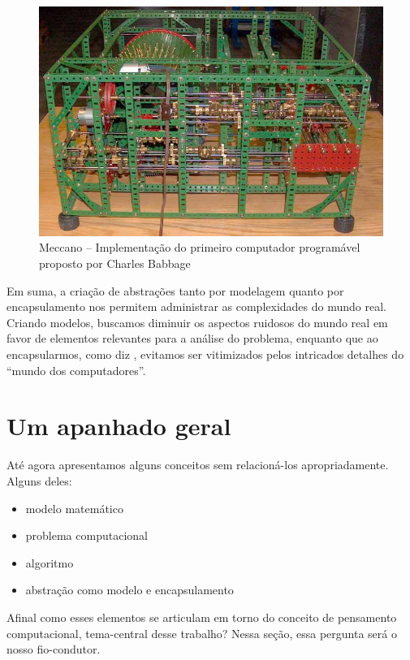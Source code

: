 \begin{figure}[!htb]
	\caption{Meccano -- Implementação do primeiro computador programável proposto por Charles Babbage }\label{fig:meccano}
	\begin{center}
		\includegraphics[scale=0.45]{imagens/babbage}
	\end{center}
\end{figure}

Em suma, a criação de abstrações tanto por modelagem quanto por encapsulamento nos permitem administrar as complexidades do mundo real. Criando modelos, buscamos diminuir os aspectos ruidosos do mundo real em favor de elementos relevantes para a análise do problema, enquanto que ao encapsularmos, como diz , evitamos ser vitimizados pelos intricados detalhes do ``mundo dos computadores''.

\section{Um apanhado geral}

Até agora apresentamos alguns conceitos sem relacioná-los apropriadamente. Alguns deles:

\begin{itemize}
	\item modelo matemático
	\item problema computacional
	\item algoritmo
	\item abstração como modelo e encapsulamento
\end{itemize}
	
Afinal como esses elementos se articulam em torno do conceito de pensamento computacional, tema-central desse trabalho? Nessa seção, essa pergunta será o nosso fio-condutor.

